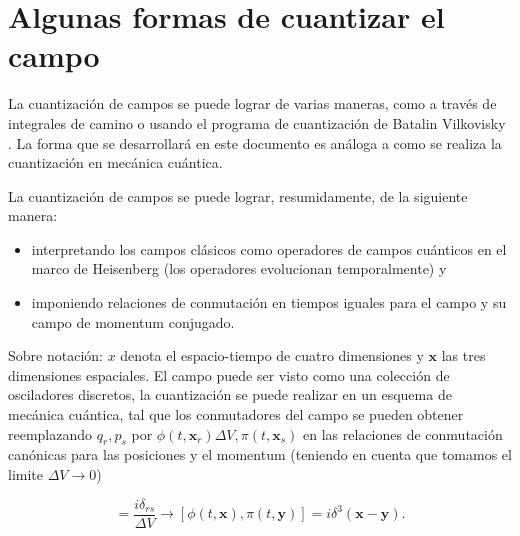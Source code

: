 \documentclass{article}
\begin{document}
\section{Algunas formas de cuantizar el campo}
La cuantización de campos se puede lograr de varias maneras, como a través de integrales de camino o usando el programa de cuantización de Batalin Vilkovisky \cite{Kaku:1993}. La forma que se desarrollará en este documento es análoga a como se realiza la cuantización en mecánica cuántica. 

La cuantización de campos se puede lograr, resumidamente, de la siguiente manera:
\begin{itemize}
\item interpretando los campos clásicos como operadores de campos cuánticos en el marco de Heisenberg (los operadores evolucionan temporalmente) y 
\item imponiendo relaciones de conmutación en tiempos iguales para el campo y su campo de momentum conjugado.
\end{itemize}
Sobre notación: $x$ denota el espacio-tiempo de cuatro dimensiones y $\mathbf{x}$ las tres dimensiones espaciales.
El campo puede ser visto como una colección de osciladores discretos, la cuantización se puede realizar en un esquema de mecánica cuántica, tal que los conmutadores del campo se pueden obtener reemplazando $q_r, p_s$ por $\phi(t,\mathbf{x}_r) \Delta V, \pi(t,\mathbf{x}_s)$ en las relaciones de conmutación canónicas para las posiciones y el momentum (teniendo en cuenta que tomamos el limite $\Delta V \rightarrow 0 $)

\begin{equation}
  [\phi(t,\mathbf{x}_r),\pi(t,\mathbf{x}_s)] = \frac{i \delta_{rs}}{\Delta V} \longrightarrow  [\phi(t,\mathbf{x}),\pi(t,\mathbf{y})] = i\delta^3(\mathbf{x}-\mathbf{y}).
\end{equation}
\end{document}
